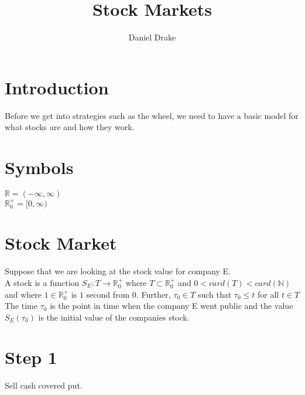 \documentclass[12pt]{extarticle}
\title{Stock Markets}
\author{Daniel Drake}
\theoremstyle{plain}
\theoremstyle{Definition}
\theoremstyle{Definition}
\theoremstyle{plain}
\begin{document}
	\maketitle

	\section{Introduction}
	Before we get into strategies such as the wheel, we need to have a basic model for what stocks are and how they work. 
	
	\section{Symbols}
	$\mathbb{R} = (-\infty,\infty)$ \\ 
	$\mathbb{R}^+_0 = [0,\infty)$

	\section{Stock Market}

	Suppose that we are looking at the stock value for company E. \\
	A stock is a function $S_E : T \to \mathbb{R}^+_0$ where $T \subset \mathbb{R}^+_0$ and $0 < card(T) < card(\mathbb{N})$ and where $1 \in \mathbb{R}^+_0$ is $1$ second from 0. 
	Further, $\tau_0 \in T$ such that $\tau_0 \leq t$ for all $t \in T$ \\ 
	The time $\tau_0$ is the point in time when the company E went public and the value $S_E(\tau_0)$ is the initial value of the companies stock. \\

	
	\section{Step 1}
	Sell cash covered put. \\ \\


	
\end{document}
